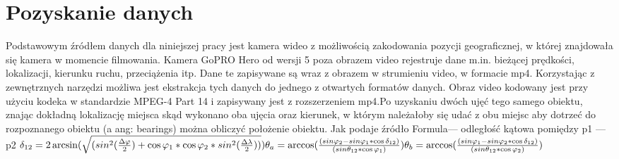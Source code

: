 \section{Pozyskanie danych}
Podstawowym źródłem danych dla niniejszej pracy jest kamera wideo z możliwością zakodowania pozycji geograficznej, w której znajdowała się kamera w momencie filmowania. Kamera GoPRO Hero\cite{goprodata} od wersji 5 poza obrazem video rejestruje dane m.in. bieżącej prędkości, lokalizacji, kierunku ruchu, przeciążenia itp.
Dane te zapisywane są wraz z obrazem w strumieniu video, w formacie mp4. Korzystając z zewnętrznych narzędzi\cite{goprotools1}\cite{goprotools2} możliwa jest ekstrakcja tych danych do jednego z otwartych formatów danych.\newline
Obraz video kodowany jest przy użyciu kodeka w standardzie MPEG-4 Part 14 i zapisywany jest z rozszerzeniem mp4.\newline Po uzyskaniu dwóch ujęć tego samego obiektu, znając dokładną lokalizację miejsca skąd wykonano oba ujęcia oraz kierunek, w którym należałoby się udać z obu miejsc aby dotrzeć do rozpoznanego obiektu (a ang: bearings) można obliczyć położenie obiektu.
Jak podaje źródło\cite{bearings}\newline
Formula--- odległość kątowa pomiędzy p1 --- p2\newline
\begin{math}\delta_{12} = 2\arcsin( \sqrt{(sin^2(\frac{\Delta\varphi}{2}) + \cos\varphi_{1} * \cos \varphi_{2} * sin^2(\frac{\Delta\lambda}{2}))}) \newline
\theta_{a} = \arccos(\frac{(sin\varphi_{2} - sin\varphi_{1}* \cos\delta_{12}) }{ (sin\theta_{12}*\cos\varphi_{1})})\newline
\theta _{b} = \arccos(\frac{(sin\varphi_{1} - sin\varphi_{2}*\cos\delta_{12}) }{ (sin\theta_{12}*\cos\varphi_{2})}) 
\end{math}\newline
{}